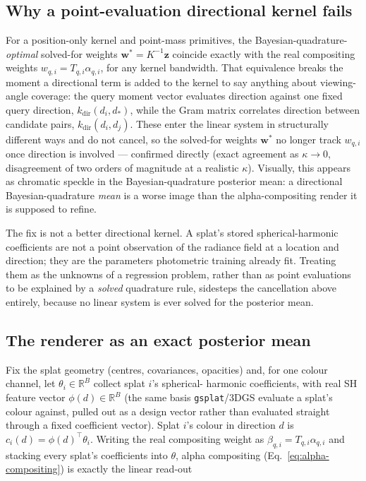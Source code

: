\documentclass[letterpaper,10pt,conference]{ieeeconf}
\newcommand{\R}{\mathbb{R}}
\begin{document}
\subsection{Why a point-evaluation directional kernel fails}
\label{sec:retired-directional-kernel}

For a position-only kernel and point-mass primitives, the Bayesian-quadrature-\emph{optimal}
solved-for weights $\mathbf w^\ast=K^{-1}\mathbf z$ coincide exactly with
the real compositing weights $w_{q,i}=T_{q,i}\alpha_{q,i}$, for any kernel
bandwidth. That equivalence breaks the moment a directional term is
added to the kernel to say anything about viewing-angle coverage: the
query moment vector evaluates direction against one fixed query direction,
$k_{\mathrm{dir}}(d_i,d_*)$, while the Gram matrix correlates direction
between candidate pairs, $k_{\mathrm{dir}}(d_i,d_j)$. These enter the
linear system in structurally different ways and do not cancel, so the
solved-for weights $\mathbf w^\ast$ no longer track $w_{q,i}$ once
direction is involved --- confirmed directly (exact agreement as
$\kappa\to0$, disagreement of two orders of magnitude at a realistic
$\kappa$). Visually, this appears as chromatic speckle in the
Bayesian-quadrature posterior mean: a directional Bayesian-quadrature
\emph{mean} is a worse image than the alpha-compositing render it is
supposed to refine.

The fix is not a better directional kernel. A splat's stored
spherical-harmonic coefficients are not a point observation of the
radiance field at a location and direction; they are the parameters
photometric training already fit. Treating them as the unknowns of a
regression problem, rather than as point evaluations to be explained by a
\emph{solved} quadrature rule, sidesteps the cancellation above entirely,
because no linear system is ever solved for the posterior mean.

\subsection{The renderer as an exact posterior mean}
\label{sec:renderer-consistency}

Fix the splat geometry (centres, covariances, opacities) and, for one
colour channel, let $\theta_i\in\R^{B}$ collect splat $i$'s spherical-
harmonic coefficients, with real SH feature vector $\phi(d)\in\R^{B}$ (the
same basis \texttt{gsplat}/3DGS evaluate a splat's colour against, pulled
out as a design vector rather than evaluated straight through a fixed
coefficient vector). Splat $i$'s colour in direction $d$ is
$c_i(d)=\phi(d)^\top\theta_i$. Writing the real compositing weight as
$\beta_{q,i}=T_{q,i}\alpha_{q,i}$ and stacking every splat's coefficients
into $\theta$, alpha compositing (Eq.~\eqref{eq:alpha-compositing}) is
exactly the linear read-out
\end{document}
